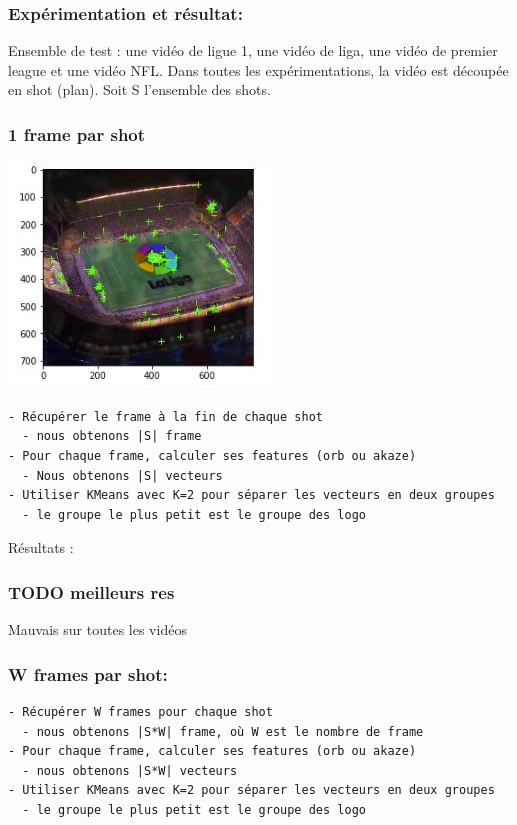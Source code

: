 \documentclass[11pt]{article}
\begin{document}
\subsubsection{Expérimentation et résultat:}
\label{sec:org15946e5}
Ensemble de test : une vidéo de ligue 1, une vidéo de liga, une vidéo de premier league et une vidéo NFL.
Dans toutes les expérimentations, la vidéo est découpée en shot (plan).
Soit S l'ensemble des shots.

\subsubsection{1 frame par shot}
\label{sec:org902acaa}
\begin{center}
\includegraphics[width=.9\linewidth]{orb_simple_res.JPG}
\end{center}
\begin{verbatim}
- Récupérer le frame à la fin de chaque shot
  - nous obtenons |S| frame
- Pour chaque frame, calculer ses features (orb ou akaze)
  - Nous obtenons |S| vecteurs
- Utiliser KMeans avec K=2 pour séparer les vecteurs en deux groupes
  - le groupe le plus petit est le groupe des logo
\end{verbatim}

Résultats :
\subsubsection{{\bfseries\sffamily TODO} meilleurs res}
\label{sec:orgfe87627}
Mauvais sur toutes les vidéos

\subsubsection{W frames par shot:}
\label{sec:orga29ce9f}
\begin{verbatim}
- Récupérer W frames pour chaque shot
  - nous obtenons |S*W| frame, où W est le nombre de frame
- Pour chaque frame, calculer ses features (orb ou akaze)
  - nous obtenons |S*W| vecteurs
- Utiliser KMeans avec K=2 pour séparer les vecteurs en deux groupes
  - le groupe le plus petit est le groupe des logo
\end{verbatim}
\end{document}
